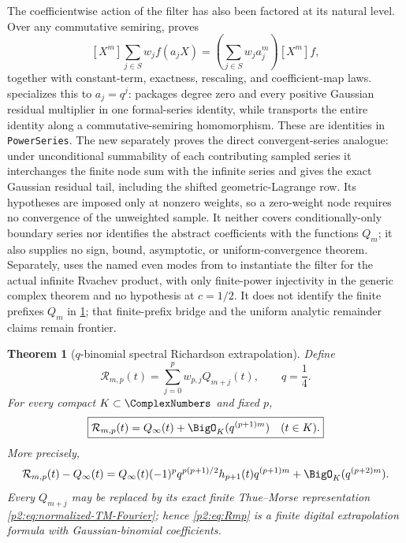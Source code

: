 \documentclass[11pt,oneside]{article}
\numberwithin{equation}{section}
\newtheorem{theorem}{Theorem}[section]
\theoremstyle{definition}
\theoremstyle{remark}
\begin{document}
The coefficientwise action of the filter has also been factored at its
natural level.  Over any commutative semiring,
 proves
\[
 [X^m]\sum_{j\in S}w_j f(a_jX)
 =\left(\sum_{j\in S}w_ja_j^m\right)[X^m]f,
\]
together with constant-term, exactness, rescaling, and coefficient-map laws.
 specializes this to \(a_j=q^j\):
 packages degree
zero and every positive Gaussian residual multiplier in one formal-series
identity, while  transports the entire
identity along a commutative-semiring homomorphism.  These are identities in
\texttt{PowerSeries}.  The new  separately
proves the direct convergent-series analogue: under unconditional summability
of each contributing sampled series it interchanges the finite node sum with
the infinite series and gives the exact Gaussian residual tail, including the
shifted geometric-Lagrange row.  Its hypotheses are imposed only at nonzero
weights, so a zero-weight node requires no convergence of the unweighted
sample.  It neither covers conditionally-only boundary series nor identifies
the abstract coefficients with the functions \(Q_m\); it also supplies no
sign, bound, asymptotic, or uniform-convergence theorem.  Separately,
 uses the named even modes from
 to instantiate the filter for the actual infinite
Rvachev product, with only finite-power injectivity in the generic complex
theorem and no hypothesis at \(c=1/2\).  It does not identify the finite
prefixes \(Q_m\) in \cref{p2:thm:qRichardson}; that finite-prefix bridge and
the uniform analytic remainder claims remain frontier.

\begin{theorem}[$q$-binomial spectral Richardson extrapolation]
\label{p2:thm:qRichardson}
Define
\begin{equation}
 \mathcal R_{m,p}(t)=\sum_{j=0}^{p}w_{p,j}Q_{m+j}(t),
 \qquad q=\frac14.
 \label{p2:eq:Rmp}
\end{equation}
For every compact $K\subset\ComplexNumbers$ and fixed $p$,
\begin{equation}
 \boxed{
 \mathcal R_{m,p}(t)=Q_\infty(t)+\BigO_K(q^{(p+1)m})
 \quad(t\in K).}
 \label{p2:eq:Richardson-order}
\end{equation}
More precisely,
\begin{equation}
 \mathcal R_{m,p}(t)-Q_\infty(t)
 =Q_\infty(t)(-1)^pq^{p(p+1)/2}h_{p+1}(t)q^{(p+1)m}
 +\BigO_K(q^{(p+2)m}).
 \label{p2:eq:Richardson-leading}
\end{equation}
Every $Q_{m+j}$ may be replaced by its exact finite Thue--Morse representation
\eqref{p2:eq:normalized-TM-Fourier}; hence \eqref{p2:eq:Rmp} is a finite digital extrapolation
formula with Gaussian-binomial coefficients.
\newresult
\end{theorem}
\end{document}
